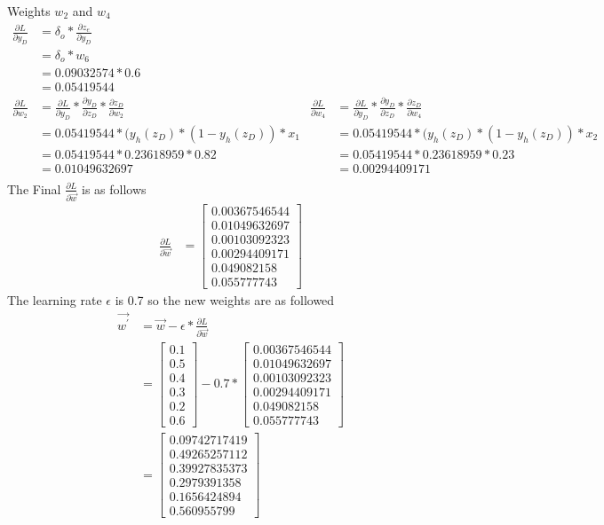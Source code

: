 \documentclass[12pt,english]{article}
\begin{document}
Weights $w_2$ and $w_4$
\begin{align*}
 \frac{\partial L}{\partial y_D}  &= \delta_o * \frac{\partial z_e}{\partial y_D}\\
&= \delta_o * w_6\\
&= 0.09032574 * 0.6\\
&= 0.05419544\\
\frac{\partial L}{\partial w_2} &=\frac{\partial L}{\partial y_D} * \frac{\partial y_D}{\partial z_D} * \frac{\partial z_D}{\partial w_2} &
\frac{\partial L}{\partial w_4} &=\frac{\partial L}{\partial y_D} * \frac{\partial y_D}{\partial z_D} * \frac{\partial z_D}{\partial w_4} \\
&=0.05419544 * (y_h(z_D) *(1 -y_h(z_D)) * x_1 &
&=0.05419544 * (y_h(z_D) *(1 -y_h(z_D)) * x_2\\
&=0.05419544 * 0.23618959 * 0.82 &
&=0.05419544 * 0.23618959 * 0.23\\
&=0.01049632697 &
&=0.00294409171\\
\end{align*}
The Final $\frac{\partial L}{\partial\vec{w}}$ is as follows
\begin{align*}
\frac{\partial L}{\partial\vec{w}} &= \begin{bmatrix} 0.00367546544 \\0.01049632697 \\0.00103092323\\0.00294409171\\0.049082158\\0.055777743\end{bmatrix}
\end{align*}
The learning rate $\epsilon$ is 0.7 so the new weights are as followed
\begin{align*}
\vec{w^\prime} &=\vec{w} - \epsilon* \frac{\partial L}{\partial \vec{w}}\\
&=\begin{bmatrix} 0.1\\0.5\\0.4\\0.3\\0.2\\0.6\end{bmatrix}- 
0.7* \begin{bmatrix} 0.00367546544 \\0.01049632697 \\0.00103092323\\0.00294409171\\0.049082158\\0.055777743\end{bmatrix}\\
&= \begin{bmatrix} 0.09742717419 \\0.49265257112\\0.39927835373\\0.2979391358\\0.1656424894\\0.560955799\end{bmatrix}\\
\end{align*}
\end{document}
